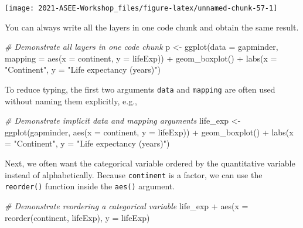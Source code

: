 \documentclass[
]{book}
\newenvironment{Shaded}{\begin{snugshade}}{\end{snugshade}}
\newcommand{\AttributeTok}[1]{\textcolor[rgb]{0.77,0.63,0.00}{#1}}
\newcommand{\CommentTok}[1]{\textcolor[rgb]{0.56,0.35,0.01}{\textit{#1}}}
\newcommand{\FunctionTok}[1]{\textcolor[rgb]{0.00,0.00,0.00}{#1}}
\newcommand{\NormalTok}[1]{#1}
\newcommand{\OtherTok}[1]{\textcolor[rgb]{0.56,0.35,0.01}{#1}}
\newcommand{\SpecialCharTok}[1]{\textcolor[rgb]{0.00,0.00,0.00}{#1}}
\newcommand{\StringTok}[1]{\textcolor[rgb]{0.31,0.60,0.02}{#1}}
\begin{document}
\texttt{[image: 2021-ASEE-Workshop\_files/figure-latex/unnamed-chunk-57-1]}

You can always write all the layers in one code chunk and obtain the same result.

\begin{Shaded}
\begin{Highlighting}[]
\CommentTok{\# Demonstrate all layers in one code chunk }
\NormalTok{p }\OtherTok{\textless{}{-}}  \FunctionTok{ggplot}\NormalTok{(}\AttributeTok{data =}\NormalTok{ gapminder, }\AttributeTok{mapping =} \FunctionTok{aes}\NormalTok{(}\AttributeTok{x =}\NormalTok{ continent, }\AttributeTok{y =}\NormalTok{ lifeExp)) }\SpecialCharTok{+}
  \FunctionTok{geom\_boxplot}\NormalTok{() }\SpecialCharTok{+}
  \FunctionTok{labs}\NormalTok{(}\AttributeTok{x =} \StringTok{"Continent"}\NormalTok{, }\AttributeTok{y =} \StringTok{"Life expectancy (years)"}\NormalTok{)}
\end{Highlighting}
\end{Shaded}

To reduce typing, the first two arguments \texttt{data} and \texttt{mapping} are often used without naming them explicitly, e.g.,

\begin{Shaded}
\begin{Highlighting}[]
\CommentTok{\# Demonstrate implicit data and mapping arguments}
\NormalTok{life\_exp }\OtherTok{\textless{}{-}}  \FunctionTok{ggplot}\NormalTok{(gapminder, }\FunctionTok{aes}\NormalTok{(}\AttributeTok{x =}\NormalTok{ continent, }\AttributeTok{y =}\NormalTok{ lifeExp)) }\SpecialCharTok{+}
  \FunctionTok{geom\_boxplot}\NormalTok{() }\SpecialCharTok{+}
  \FunctionTok{labs}\NormalTok{(}\AttributeTok{x =} \StringTok{"Continent"}\NormalTok{, }\AttributeTok{y =} \StringTok{"Life expectancy (years)"}\NormalTok{)}
\end{Highlighting}
\end{Shaded}

Next, we often want the categorical variable ordered by the quantitative variable instead of alphabetically. Because \texttt{continent} is a factor, we can use the \texttt{reorder()} function inside the \texttt{aes()} argument.

\begin{Shaded}
\begin{Highlighting}[]
\CommentTok{\# Demonstrate reordering a categorical variable }
\NormalTok{life\_exp }\SpecialCharTok{+} 
  \FunctionTok{aes}\NormalTok{(}\AttributeTok{x =} \FunctionTok{reorder}\NormalTok{(continent, lifeExp), }\AttributeTok{y =}\NormalTok{ lifeExp)}
\end{Highlighting}
\end{Shaded}
\end{document}
